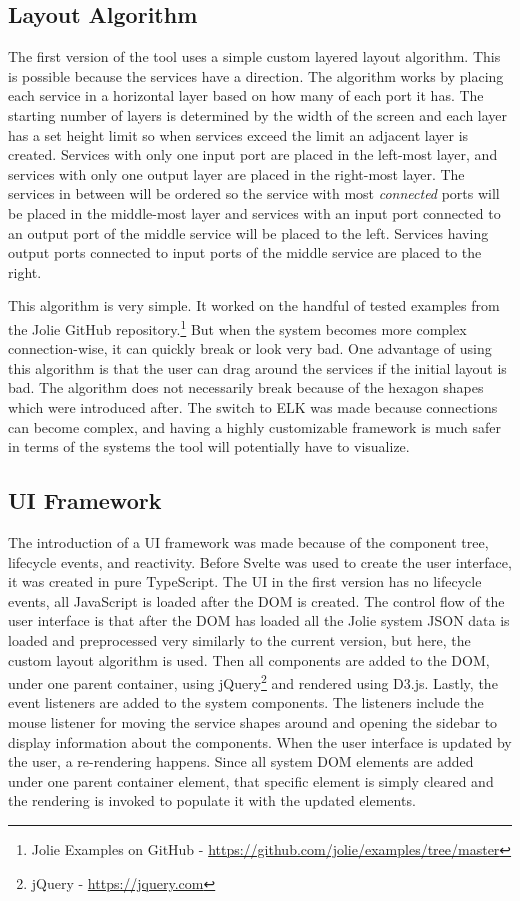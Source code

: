 \subsection{Layout Algorithm}
The first version of the tool uses a simple custom layered layout algorithm. This is possible because the services have a direction.
The algorithm works by placing each service in a horizontal layer based on how many of each port it has. The starting number of layers is determined by the width of the screen and each layer has a set height limit so when services exceed the limit an adjacent layer is created.
Services with only one input port are placed in the left-most layer, and services with only one output layer are placed in the right-most layer.
The services in between will be ordered so the service with most \textit{connected} ports will be placed in the middle-most layer and services with an input port connected to an output port of the middle service will be placed to the left. Services having output ports connected to input ports of the middle service are placed to the right.

This algorithm is very simple. It worked on the handful of tested examples from the Jolie GitHub repository.\footnote{Jolie Examples on GitHub - \url{https://github.com/jolie/examples/tree/master}}
But when the system becomes more complex connection-wise, it can quickly break or look very bad. One advantage of using this algorithm is that the user can drag around the services if the initial layout is bad.
The algorithm does not necessarily break because of the hexagon shapes which were introduced after. The switch to ELK was made because connections can become complex, and having a highly customizable framework is much safer in terms of the systems the tool will potentially have to visualize.

\subsection{UI Framework}
The introduction of a UI framework was made because of the component tree, lifecycle events, and reactivity. Before Svelte was used to create the user interface, it was created in pure TypeScript.
The UI in the first version has no lifecycle events, all JavaScript is loaded after the DOM is created.
The control flow of the user interface is that after the DOM has loaded all the Jolie system JSON data is loaded and preprocessed very similarly to the current version, but here, the custom layout algorithm is used.
Then all components are added to the DOM, under one parent container, using jQuery\footnote{jQuery - \url{https://jquery.com}} and rendered using D3.js. Lastly, the event listeners are added to the system components. The listeners include the mouse listener for moving the service shapes around and opening the sidebar to display information about the components.
When the user interface is updated by the user, a re-rendering happens. Since all system DOM elements are added under one parent container element, that specific element is simply cleared and the rendering is invoked to populate it with the updated elements.

